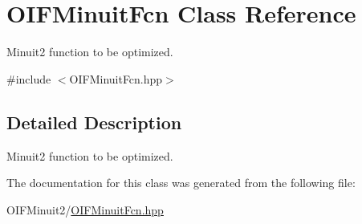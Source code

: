 \hypertarget{classOIFMinuitFcn}{
\section{OIFMinuitFcn Class Reference}
\label{d5/d19/classOIFMinuitFcn}
}


Minuit2 function to be optimized.  




{\ttfamily \#include $<$OIFMinuitFcn.hpp$>$}



\subsection{Detailed Description}
Minuit2 function to be optimized. 

The documentation for this class was generated from the following file:\begin{DoxyCompactItemize}
\item 
OIFMinuit2/\hyperlink{OIFMinuitFcn_8hpp}{OIFMinuitFcn.hpp}\end{DoxyCompactItemize}
